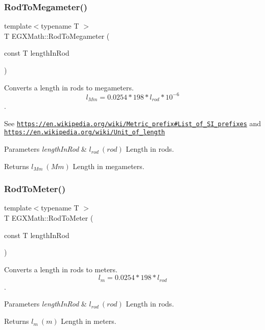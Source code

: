 \subsubsection{\texorpdfstring{Rod\+To\+Megameter()}{RodToMegameter()}}
{\footnotesize\ttfamily template$<$typename T $>$ \\
T E\+G\+X\+Math\+::\+Rod\+To\+Megameter (\begin{DoxyParamCaption}\item[{const T}]{length\+In\+Rod }\end{DoxyParamCaption})}



Converts a length in rods to megameters. \[ l_{Mm}=0.0254 * 198 * l_{rod} * 10^{-6} \]. 

See \href{https://en.wikipedia.org/wiki/Metric_prefix#List_of_SI_prefixes}{\tt https\+://en.\+wikipedia.\+org/wiki/\+Metric\+\_\+prefix\#\+List\+\_\+of\+\_\+\+S\+I\+\_\+prefixes} and \href{https://en.wikipedia.org/wiki/Unit_of_length}{\tt https\+://en.\+wikipedia.\+org/wiki/\+Unit\+\_\+of\+\_\+length} 
\begin{DoxyParams}{Parameters}
{\em length\+In\+Rod} & $ l_{rod}\ (rod)$ Length in rods. \\
\hline
\end{DoxyParams}
\begin{DoxyReturn}{Returns}
$ l_{Mm}\ (Mm)$ Length in megameters. 
\end{DoxyReturn}
\mbox{\label{group___e_g_x_math-_conversions-_length_conversions-_imperial-_rod-_s_i_gabe33821aac19a508109735df98a1e74c}} 
\subsubsection{\texorpdfstring{Rod\+To\+Meter()}{RodToMeter()}}
{\footnotesize\ttfamily template$<$typename T $>$ \\
T E\+G\+X\+Math\+::\+Rod\+To\+Meter (\begin{DoxyParamCaption}\item[{const T}]{length\+In\+Rod }\end{DoxyParamCaption})}



Converts a length in rods to meters. \[ l_{m}=0.0254 * 198 * l_{rod} \]. 


\begin{DoxyParams}{Parameters}
{\em length\+In\+Rod} & $ l_{rod}\ (rod)$ Length in rods. \\
\hline
\end{DoxyParams}
\begin{DoxyReturn}{Returns}
$ l_{m}\ (m)$ Length in meters. 
\end{DoxyReturn}
\mbox{\label{group___e_g_x_math-_conversions-_length_conversions-_imperial-_rod-_s_i_ga8821e67ddd408e4b4b9c4d1512b6a9d8}} 
